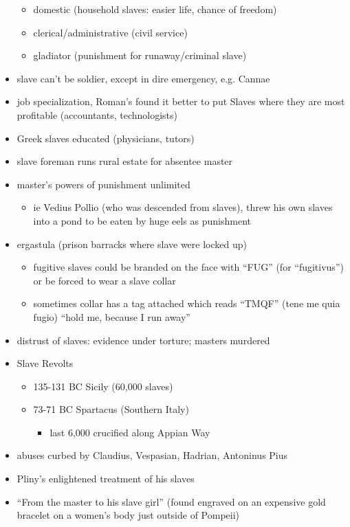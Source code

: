 \documentclass[12pt, twoside]{article}
\begin{document}
\begin{itemize}
\begin{itemize}
	\item domestic (household slaves: easier life, chance of freedom)
	\item clerical/administrative (civil service)
	\item gladiator (punishment for runaway/criminal slave) 
	\end{itemize}
\item slave can't be soldier, except in dire emergency, e.g. Cannae
\item job specialization, Roman's found it better to put Slaves where they are most profitable (accountants, technologists)
\item Greek slaves educated (physicians, tutors)
\item slave foreman runs rural estate for absentee master
\item master's powers of punishment unlimited
	\begin{itemize}
	\item ie Vedius Pollio (who was descended from slaves), threw his own slaves into a pond to be eaten by huge eels as punishment
	\end{itemize}
\item ergastula (prison barracks where slave were locked up)
	\begin{itemize}
	\item fugitive slaves could be branded on the face  with “FUG” (for “fugitivus”) or be forced to wear a slave collar
	\item sometimes collar has a tag attached which reads “TMQF” (tene me quia fugio) “hold me, because I run away” 
	\end{itemize}
\item distrust of slaves: evidence under torture; masters murdered
\item Slave Revolts
	\begin{itemize}
	\item 135-131 BC Sicily (60,000 slaves)
	\item 73-71 BC Spartacus (Southern Italy)
		\begin{itemize}
		\item last 6,000 crucified along Appian Way
		\end{itemize}
	\end{itemize}
\item abuses curbed by Claudius, Vespasian, Hadrian, Antoninus Pius
\item Pliny's enlightened treatment of his slaves
\item “From the master to his slave girl” (found engraved on an expensive gold bracelet on a women’s body just outside of Pompeii)

\end{itemize}
\end{document}
